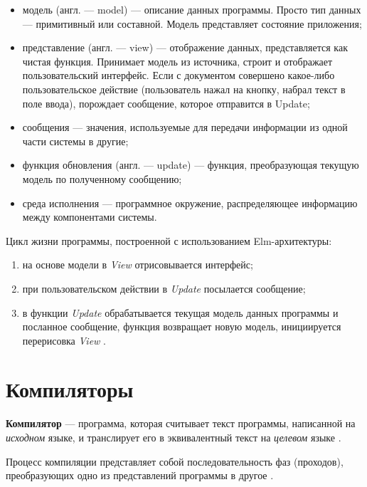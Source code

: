 \begin{itemize}
    \item модель (англ. --- model) --- описание данных программы. Просто тип данных --- примитивный или составной. Модель представляет состояние приложения;
    \item представление (англ. --- view) --- отображение данных, представляется как чистая функция. Принимает модель из источника, строит и отображает пользовательский интерфейс.
    Если с документом совершено какое-либо пользовательское действие (пользователь нажал на кнопку, набрал текст в поле ввода), порождает сообщение, которое отправится в Update;
    \item сообщения --- значения, используемые для передачи информации из одной части системы в другие;
    \item функция обновления (англ. --- update) --- функция, преобразующая текущую модель по полученному сообщению;
    \item среда исполнения --- программное окружение, распределяющее информацию между компонентами системы.
\end{itemize}

Цикл жизни программы, построенной с использованием Elm-архитектуры:

\begin{enumerate}
    \item на основе модели в \textit{View} отрисовывается интерфейс;
    \item при пользовательском действии в \textit{Update} посылается сообщение;
    \item в функции \textit{Update} обрабатывается текущая модель данных программы и посланное сообщение, функция возвращает новую модель, инициируется перерисовка \textit{View} \cite{elminaction}.
\end{enumerate}

\FloatBarrier

\section{Компиляторы}\label{sec:ch1/sec5}

\textbf{Компилятор} --- программа, которая считывает текст программы, написанной
на \textit{исходном} языке, и транслирует его в эквивалентный текст на
\textit{целевом} языке \cite[с.~29]{dragonbook}.

Процесс компиляции представляет собой последовательность фаз (проходов),
преобразующих одно из представлений программы в другое \cite[с.~33]{dragonbook}.

